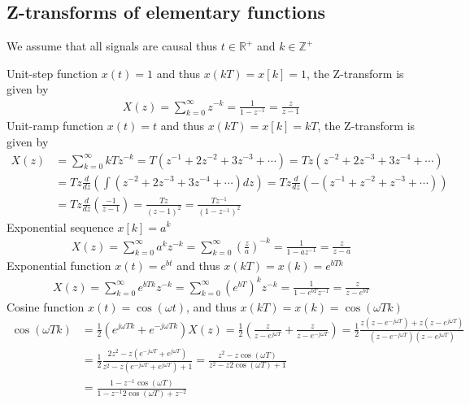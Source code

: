 \documentclass[twoside]{article}
\begin{document}
\subsection*{Z-transforms of elementary functions}

We assume that all signals are causal thus $t \in \mathbb{R}^+$
and $k \in \mathbb{Z}^+$

Unit-step function $x(t) = 1$ and thus $x(kT) = x[k] = 1$, the
Z-transform is given by
%
\begin{align*}
 X(z) = \sum\limits_{k=0}^{\infty} z^{-k} = \frac{1}{1 - z^{-1}} =
  \frac{z}{z - 1}
\end{align*}
%
Unit-ramp function $x(t) = t$ and thus $x(kT) = x[k] = kT$, the
Z-transform is given by
%
\begin{align*}
 X(z) &= \sum\limits_{k=0}^{\infty} kT z^{-k} = T (z^{-1} + 2 z^{-2}  +
  3 z^{-3}  + \cdots) 
= T z (z^{-2} + 2 z^{-3}  +
  3 z^{-4}  + \cdots) \\ &= T z \frac{d}{dz} \left( 
 \int (z^{-2} + 2 z^{-3}  + 3 z^{-4}  + \cdots) dz \right)
= T z \frac{d}{dz} \left( 
  -(z^{-1} + z^{-2}  + z^{-3}  + \cdots) \right)
\\
&= T z \frac{d}{dz} \left(  \frac{-1}{z-1} \right)  = \frac{T
  z}{(z-1)^2} =
\frac{T z^{-1}}{(1 - z^{-1})^2} 
\end{align*}
%
Exponential sequence $x[k] = a^k$
%
\begin{align*}
 X(z) = \sum\limits_{k=0}^{\infty} a^k z^{-k} =
  \sum\limits_{k=0}^{\infty} \left( \frac{z}{a} \right)^{-k} = 
\frac{1}{1 - a z^{-1}} = \frac{z}{z - a}
\end{align*}
%
Exponential function $x(t) = e^{b t}$ and thus $x(k T) = x(k) = e^{b T
  k}$
%
\begin{align*}
 X(z) = \sum\limits_{k=0}^{\infty} e^{b T k} z^{-k} = \sum\limits_{k=0}^{\infty} (e^{b T})^k z^{-k}
= \frac{1}{1 - e^{b T} z^{-1}} = \frac{z}{z - e^{b T}}
\end{align*}
%
Cosine function $x(t) = \cos (\omega t)$, and thus $x(k T) = x(k) =
\cos (\omega T k)$
%
\begin{align*}
\cos (\omega T k) &= \frac{1}{2} \left( e^{j \omega T k} + e^{-j \omega T k} \right)
 X(z) = \frac{1}{2} \left( \frac{z}{z - e^{j \omega T}} +  \frac{z}{z
  - e^{-j \omega T}} \right) = 
\frac{1}{2} \frac{z(z - e^{-j \omega T}) + z(z - e^{j \omega T})}{(z
  - e^{-j \omega T}) (z - e^{j \omega T})}
\\
&= \frac{1}{2} \frac{2 z^2 - z(e^{-j \omega T} + e^{j \omega T})}{z^2
  -z (e^{-j \omega T} + e^{j \omega T}) + 1}
= \frac{z^2 - z \cos(\omega T)}{z^2 - z 2 \cos (\omega T)+ 1}
\\ &= \frac{1 - z^{-1} \cos(\omega T)}{1 - z^{- 1} 2 \cos (\omega T) + z^{-2}}
\end{align*}
%
\end{document}
